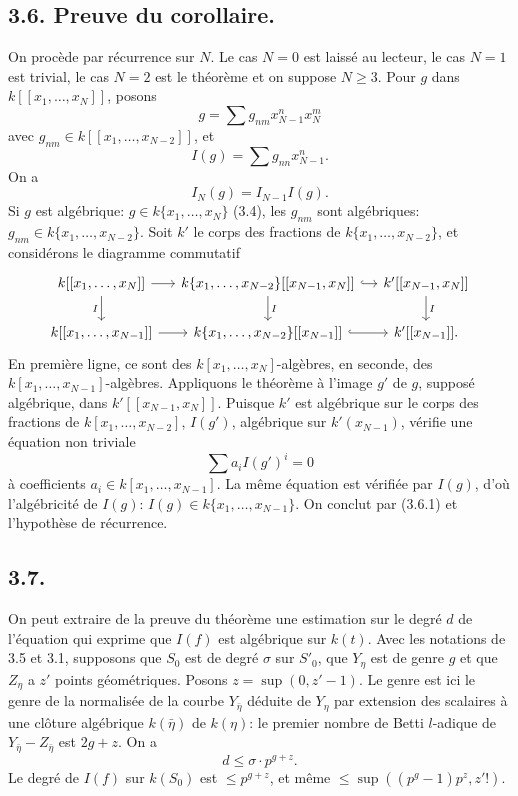 \documentclass[11pt]{article}
\begin{document}
\subsection*{3.6. Preuve du corollaire.}
On procède par récurrence sur $N$. Le cas $N=0$ est laissé au lecteur, le cas $N=1$ est trivial, le cas $N=2$ est le théorème et on suppose $N\ge3$. Pour $g$ dans $k[[x_1,\ldots,x_N]]$, posons
\[
        g=\sum g_{nm}x_{N-1}^n x_N^m
\]
avec $g_{nm}\in k[[x_1,\ldots,x_{N-2}]]$, et
\[
        I(g)=\sum g_{nn}x_{N-1}^n.
\]
On a
\begin{equation}
        I_N(g)=I_{N-1}I(g). \tag{3.6.1}
\end{equation}
Si $g$ est algébrique: $g\in k\{x_1,\ldots,x_N\}$ (3.4), les $g_{nm}$ sont algébriques: $g_{nm}\in k\{x_1,\ldots,x_{N-2}\}$. Soit $k'$ le corps des fractions de $k\{x_1,\ldots,x_{N-2}\}$, et considérons le diagramme commutatif
\[
\begin{tikzcd}[column sep=small]
k[[x_1,\ldots,x_N]] \arrow[r] \arrow[d,"I"'] & k\{x_1,\ldots,x_{N-2}\}[[x_{N-1},x_N]] \arrow[r,hook] \arrow[d,"I"] & k'[[x_{N-1},x_N]] \arrow[d,"I"] \\
k[[x_1,\ldots,x_{N-1}]] \arrow[r] & k\{x_1,\ldots,x_{N-2}\}[[x_{N-1}]] \arrow[r,hook] & k'[[x_{N-1}]] .
\end{tikzcd}
\]
En première ligne, ce sont des $k[x_1,\ldots,x_N]$-algèbres, en seconde, des $k[x_1,\ldots,x_{N-1}]$-algèbres. Appliquons le théorème à l'image $g'$ de $g$, supposé algébrique, dans $k'[[x_{N-1},x_N]]$. Puisque $k'$ est algébrique sur le corps des fractions de $k[x_1,\ldots,x_{N-2}]$, $I(g')$, algébrique sur $k'(x_{N-1})$, vérifie une équation non triviale
\[
        \sum a_i I(g')^i=0
\]
à coefficients $a_i\in k[x_1,\ldots,x_{N-1}]$. La même équation est vérifiée par $I(g)$, d'où l'algébricité de $I(g)$: $I(g)\in k\{x_1,\ldots,x_{N-1}\}$. On conclut par (3.6.1) et l'hypothèse de récurrence.

\subsection*{3.7.}
On peut extraire de la preuve du théorème une estimation sur le degré $d$ de l'équation qui exprime que $I(f)$ est algébrique sur $k(t)$. Avec les notations de 3.5 et 3.1, supposons que $S_0$ est de degré $\sigma$ sur $S'_0$, que $Y_\eta$ est de genre $g$ et que $Z_\eta$ a $z'$ points géométriques. Posons $z=\sup(0,z'-1)$. Le genre est ici le genre de la normalisée de la courbe $Y_{\bar\eta}$ déduite de $Y_\eta$ par extension des scalaires à une clôture algébrique $k(\bar\eta)$ de $k(\eta)$: le premier nombre de Betti $l$-adique de $Y_{\bar\eta}-Z_{\bar\eta}$ est $2g+z$. On a
\begin{equation}
        d\le \sigma\cdot p^{g+z}. \tag{3.7.1}
\end{equation}
Le degré de $I(f)$ sur $k(S_0)$ est $\le p^{g+z}$, et même $\le\sup((p^g-1)p^z,z'!)$.
\end{document}
